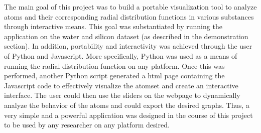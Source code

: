 The main goal of this project was to build a portable visualization tool to analyze atoms and their corresponding radial distribution functions in various substances through interactive means. This goal was substantiated by running the application on the water and silicon dataset (as described in the demonstration section). In addition, portability and interactivity was achieved through the user of Python and Javascript. More specifically, Python was used as a means of running the radial distribution function on any platform. Once this was performed, another Python script generated a html page containing the Javascript code to effectively visualize the atomset and create an interactive interface. The user could then use the sliders on the webpage to dynamically analyze the behavior of the atoms and could export the desired graphs. Thus, a very simple and a powerful application was designed in the course of this project to be used by any researcher on any platform desired.